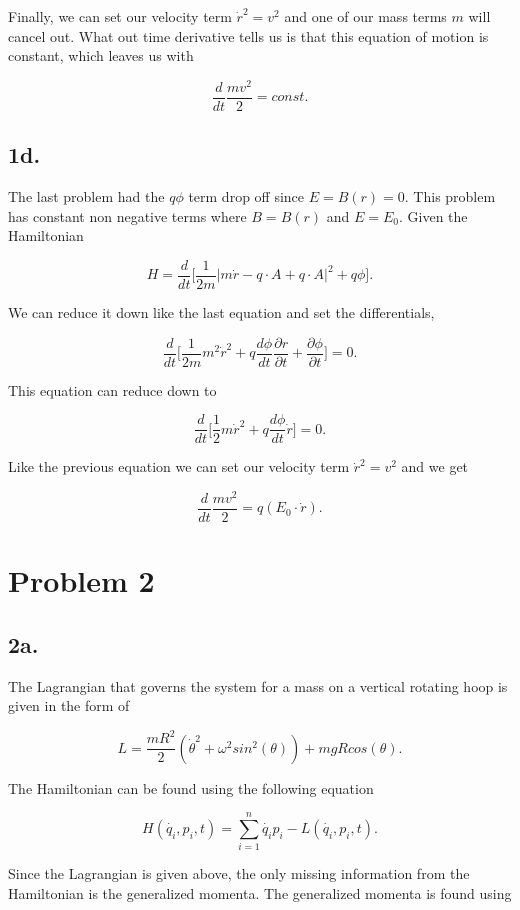 \documentclass[12pt]{article}
\begin{document}
Finally, we can set our velocity term $\dot{r}^{2} = v^{2}$ and one of our mass terms $m$ will cancel out. What out time derivative tells us is that this equation of motion is constant, which leaves us with

$$
\frac{d}{dt}\frac{mv^2}{2} = const.
$$

\subsection*{1d.}

The last problem had the $q\phi$ term drop off since $E = B(r) = 0$. This problem has constant non negative terms where $B = B(r)$ and $E = E_{0}$. Given the Hamiltonian

$$
H = \frac{d}{dt}\Big[\frac{1}{2m}|m\dot{r}- q \cdot A + q \cdot A |^{2} + q\phi\Big].
$$

We can reduce it down like the last equation and set the differentials,

$$
\frac{d}{dt} \Big[\frac{1}{2m}m^{2}\dot{r}^{2} + q\frac{d \phi}{d t}\frac{\partial r}{\partial t} + \frac{\partial \phi}{\partial t}\Big] = 0.
$$

This equation can reduce down to

$$
\frac{d}{dt} \Big[\frac{1}{2}m\dot{r}^{2} + q\frac{d \phi}{d t}\dot{r}\Big] = 0.
$$

Like the previous equation we can set our velocity term $\dot{r}^{2} = v^{2}$ and we get

$$
\frac{d}{dt} \frac{mv^2}{2} = q(E_{0} \cdot \dot{r}).
$$

\section*{Problem 2}

\subsection*{2a.}

The Lagrangian that governs the system for a mass on a vertical rotating hoop is given in the form of

$$
L = \frac{mR^2}{2}(\dot{\theta}^{2} + \omega^{2}sin^2(\theta)) + mgRcos(\theta).
$$

The Hamiltonian can be found using the following equation

$$
H(\dot{q_{i}}, p_i, t) = \sum_{i = 1}^{n} \dot{q_{i}}p_i - L(\dot{q_{i}}, p_i, t).
$$

Since the Lagrangian is given above, the only missing information from the Hamiltonian is the generalized momenta. The generalized momenta is found using 
\end{document}

